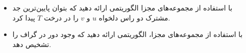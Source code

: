 \begin{itemize}
\item 
با استفاده از مجموعه‌های مجزا الگوریتمی ارائه دهید که بتوان پایین‌ترین جد مشترک دو راس دلخواه $u$ و $v$ را در
درخت $T$ پیدا کرد.

\item 
با استفاده از مجموعه‌های مجزا، الگوریتمی ارائه دهید که وجود دور در گراف را تشخیص دهد.

\end{itemize}
